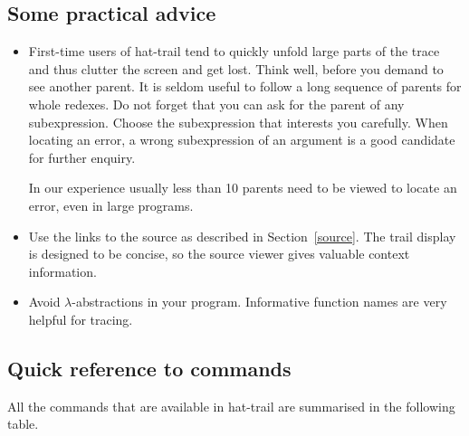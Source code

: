 \documentclass[12pt]{article}
\begin{document}

\subsection{Some practical advice}

\begin{itemize}
\item First-time users of hat-trail tend to quickly unfold large parts
of the trace and thus clutter the screen and get lost. Think well,
before you demand to see another parent. It is seldom useful to follow
a long sequence of parents for whole redexes. Do not forget that you
can ask for the parent of any subexpression. Choose the subexpression
that interests you carefully. When locating an error, a wrong
subexpression of an argument is a good candidate for further enquiry.

In our experience usually less than 10 parents need to be viewed to
locate an error, even in large programs.

\item Use the links to the source as described in Section~\ref{source}.
The trail display is designed to be concise, so the source viewer gives
valuable context information.


\item Avoid $\lambda$-abstractions in your program. Informative
function names are very helpful for tracing.

\end{itemize}



\newpage
\subsection{Quick reference to commands}\label{trailquickref}

All the commands that are available in hat-trail are summarised in
the following table.
\end{document}
